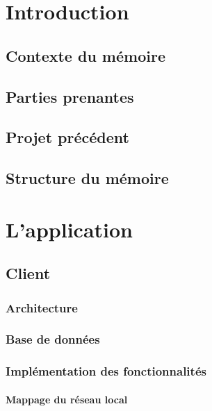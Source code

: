 \chapter{Introduction}

\section{Contexte du mémoire}
\section{Parties prenantes}
\section{Projet précédent}
\section{Structure du mémoire}







\chapter{L'application}



\section{Client}

\subsection{Architecture}
\subsection{Base de données}

\subsection{Implémentation des fonctionnalités}
\subsubsection{Mappage du réseau local}


